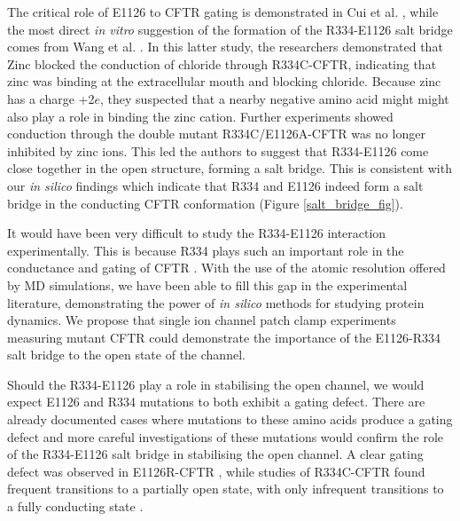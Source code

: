 The critical role of E1126 to CFTR gating is demonstrated in Cui et al. \cite{cui2014}, while the most direct \textit{in vitro} suggestion of the formation of the R334-E1126 salt bridge comes from Wang et al. \cite{wang2016}. In this latter study, the researchers demonstrated that Zinc blocked the conduction of chloride through R334C-CFTR, indicating that zinc was binding at the extracellular mouth and blocking chloride. Because zinc has a charge +2$e$, they suspected that a nearby negative amino acid might might also play a role in binding the zinc cation. Further experiments showed conduction through the double mutant R334C/E1126A-CFTR was no longer inhibited by zinc ions. This led the authors to suggest that R334-E1126 come close together in the open structure, forming a salt bridge. This is consistent with our \textit{in silico} findings which indicate that R334 and E1126 indeed form a salt bridge in the conducting CFTR conformation (Figure \ref{salt_bridge_fig}).  

It would have been very difficult to study the R334-E1126 interaction experimentally. This is because R334 plays such an important role in the conductance and gating of CFTR \cite{zhang2005,zhang2005a, gong2004, wang2012}. With the use of the atomic resolution offered by MD simulations, we have been able to fill this gap in the experimental literature, demonstrating the power of \textit{in silico} methods for studying protein dynamics. We propose that single ion channel patch clamp experiments measuring mutant CFTR could demonstrate the importance of the E1126-R334 salt bridge to the open state of the channel. 

Should the R334-E1126 play a role in stabilising the open channel, we would expect E1126 and R334 mutations to both exhibit a gating defect. There are already documented cases where mutations to these amino acids produce a gating defect and more careful investigations of these mutations would confirm the role of the R334-E1126 salt bridge in stabilising the open channel. A clear gating defect was observed in E1126R-CFTR \cite{cui2014}, while studies of R334C-CFTR found frequent transitions to a partially open state, with only infrequent transitions to a fully conducting state \cite{zhang2005a}. 

